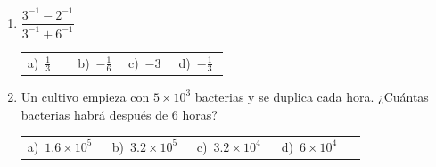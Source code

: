 \documentclass[11pt,a4paper]{article}
\begin{document}
\begin{enumerate}[label=\textbf{\arabic*.},leftmargin=*,itemsep=11pt,topsep=0pt]
\item \begin{minipage}[t]{\linewidth}
$\displaystyle \dfrac{3^{-1}-2^{-1}}{3^{-1}+6^{-1}}$

\vspace{5pt}
\begin{tabular}{@{}p{0.23\linewidth}p{0.23\linewidth}p{0.23\linewidth}p{0.23\linewidth}@{}}
a)~$\displaystyle \frac{1}{3}$ & b)~$\displaystyle -\frac{1}{6}$ & c)~$\displaystyle -3$ & d)~$\displaystyle -\frac{1}{3}$ \\
\end{tabular}
\end{minipage}

\item \begin{minipage}[t]{\linewidth}
Un cultivo empieza con $5\times 10^{3}$ bacterias y se duplica cada hora. ¿Cuántas bacterias habrá después de 6 horas?

\vspace{5pt}
\begin{tabular}{@{}p{0.23\linewidth}p{0.23\linewidth}p{0.23\linewidth}p{0.23\linewidth}@{}}
a)~$\displaystyle 1.6\times 10^{5}$ & b)~$\displaystyle 3.2\times 10^{5}$ & c)~$\displaystyle 3.2\times 10^{4}$ & d)~$\displaystyle 6\times 10^{4}$ \\
\end{tabular}
\end{minipage}
\end{enumerate}
\end{document}
